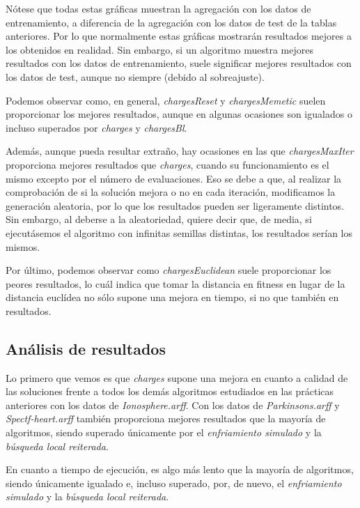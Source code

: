 \documentclass[11pt,a4paper]{article}
\begin{document}
Nótese que todas estas gráficas muestran la agregación con los datos de entrenamiento, a diferencia de la agregación con los datos de test de la tablas anteriores. Por lo que normalmente estas gráficas mostrarán resultados mejores a los obtenidos en realidad. Sin embargo, si un algoritmo muestra mejores resultados con los datos de entrenamiento, suele significar mejores resultados con los datos de test, aunque no siempre (debido al sobreajuste).

Podemos observar como, en general, \emph{chargesReset} y \emph{chargesMemetic} suelen proporcionar los mejores resultados, aunque en algunas ocasiones son igualados o incluso superados por \emph{charges} y \emph{chargesBl}.

Además, aunque pueda resultar extraño, hay ocasiones en las que \emph{chargesMaxIter} proporciona mejores resultados que \emph{charges}, cuando su funcionamiento es el mismo excepto por el número de evaluaciones. Eso se debe a que, al realizar la comprobación de si la solución mejora o no en cada iteración, modificamos la generación aleatoria, por lo que los resultados pueden ser ligeramente distintos. Sin embargo, al deberse a la aleatoriedad, quiere decir que, de media, si ejecutásemos el algoritmo con infinitas semillas distintas, los resultados serían los mismos.

Por último, podemos observar como \emph{chargesEuclidean} suele proporcionar los peores resultados, lo cuál indica que tomar la distancia en fitness en lugar de la distancia euclídea no sólo supone una mejora en tiempo, si no que también en resultados.

\subsection{Análisis de resultados}

Lo primero que vemos es que \emph{charges} supone una mejora en cuanto a calidad de las soluciones frente a todos los demás algoritmos estudiados en las prácticas anteriores con los datos de \emph{Ionosphere.arff}. Con los datos de \emph{Parkinsons.arff} y \emph{Spectf-heart.arff} también proporciona mejores resultados que la mayoría de algoritmos, siendo superado únicamente por el \emph{enfriamiento simulado} y la \emph{búsqueda local reiterada}.

En cuanto a tiempo de ejecución, es algo más lento que la mayoría de algoritmos, siendo únicamente igualado e, incluso superado, por, de nuevo, el \emph{enfriamiento simulado} y la \emph{búsqueda local reiterada}.
\end{document}
